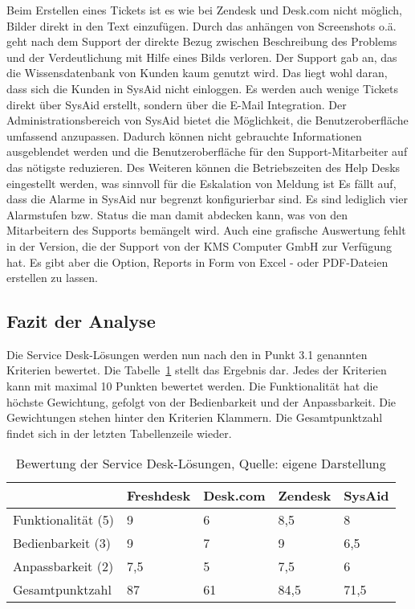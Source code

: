 Beim Erstellen eines Tickets ist es wie bei Zendesk und Desk.com nicht möglich, Bilder direkt in den Text einzufügen. Durch das anhängen von Screenshots o.ä. geht nach dem Support der direkte Bezug zwischen Beschreibung des Problems und der Verdeutlichung mit Hilfe eines Bilds verloren.\newline
Der Support gab an, das die Wissensdatenbank von Kunden kaum genutzt wird. Das liegt wohl daran, dass sich die Kunden in SysAid nicht einloggen. Es werden auch wenige Tickets direkt über SysAid erstellt, sondern über die E-Mail Integration.\newline
Der Administrationsbereich von SysAid bietet die Möglichkeit, die Benutzeroberfläche umfassend anzupassen. Dadurch können nicht gebrauchte Informationen ausgeblendet werden und die Benutzeroberfläche für den Support-Mitarbeiter auf das nötigste reduzieren. Des Weiteren können die Betriebszeiten des Help Desks eingestellt werden, was sinnvoll für die Eskalation von Meldung ist\newline
Es fällt auf, dass die Alarme in SysAid nur begrenzt konfigurierbar sind. Es sind lediglich vier Alarmstufen bzw. Status die man damit abdecken kann, was von den Mitarbeitern des Supports bemängelt wird. Auch eine grafische Auswertung fehlt in der Version, die der Support von der KMS Computer GmbH zur Verfügung hat. Es gibt aber die Option, Reports in Form von Excel - oder PDF-Dateien erstellen zu lassen.\\

\subsection{Fazit der Analyse}

\noindent
Die Service Desk-Lösungen werden nun nach den in Punkt 3.1 genannten Kriterien bewertet. Die Tabelle~\ref{tab:Auswertung} stellt das Ergebnis dar. Jedes der Kriterien kann mit maximal 10 Punkten bewertet werden. Die Funktionalität hat die höchste Gewichtung, gefolgt von der Bedienbarkeit und der Anpassbarkeit. Die Gewichtungen stehen hinter den Kriterien Klammern. Die Gesamtpunktzahl findet sich in der letzten Tabellenzeile wieder.\\

\begin{table}[h!]
    \begin{tabular}{ | p{3.5cm}| p{2.5cm} | p{2.5cm} | p{2.5cm} | p{2.5cm} |}
    \hline
       & Freshdesk & Desk.com & Zendesk & SysAid \\ \hline
   Funktionalität (5) & 9 & 6 & 8,5 & 8 \\ \hline
   Bedienbarkeit (3) & 9 & 7 & 9 & 6,5 \\ \hline
   Anpassbarkeit (2) & 7,5 & 5 & 7,5 & 6 \\ \hline
   Gesamtpunktzahl & 87 & 61 & 84,5 & 71,5 \\ \hline
    \end{tabular}
    \caption[Bewertung der Service Desk-Lösungen]{Bewertung der Service Desk-Lösungen, Quelle: eigene Darstellung}
    \label{tab:Auswertung}
\end{table}

